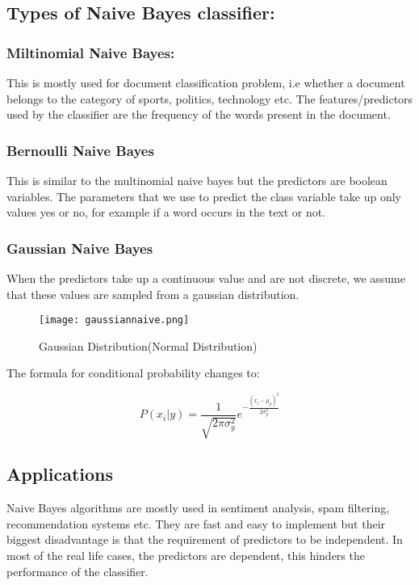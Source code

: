 \documentclass[12pt, A4]{report}
\begin{document}
\subsection*{Types of Naive Bayes classifier:}
	\subsubsection*{Miltinomial Naive Bayes:}
		This is mostly used for document classification problem, i.e whether a document belongs to the category of sports, politics, technology etc. The features/predictors used by the classifier are the frequency of the words present in the document.

	\subsubsection*{Bernoulli Naive Bayes}
		This is similar to the multinomial naive bayes but the predictors are boolean variables. The parameters that we use to predict the class variable take up only values yes or no, for example if a word occurs in the text or not.

	\subsubsection*{Gaussian Naive Bayes}
		When the predictors take up a continuous value and are not discrete, we assume that these values are sampled from a gaussian distribution.

		\begin{figure}[h]
			\centering
			\texttt{[image: gaussiannaive.png]}
			\caption{Gaussian Distribution(Normal Distribution)}
		\end{figure}

		The formula for conditional probability changes to:

		\begin{equation}
			P(x_i|y) = \frac{1}{\sqrt{2\pi\sigma_y^2}}e^{-\frac{(x_i-\mu_y)^2}{2\sigma_y^2}}
		\end{equation}

\subsection*{Applications}
	Naive Bayes algorithms are mostly used in sentiment analysis, spam filtering, recommendation systems etc. They are fast and easy to implement but their biggest disadvantage is that the requirement of predictors to be independent. In most of the real life cases, the predictors are dependent, this hinders the performance of the classifier.
\end{document}
